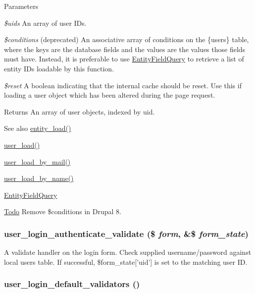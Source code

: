 \begin{DoxyParams}{Parameters}
\item[{\em \$uids}]An array of user IDs. \item[{\em \$conditions}](deprecated) An associative array of conditions on the \{users\} table, where the keys are the database fields and the values are the values those fields must have. Instead, it is preferable to use \hyperlink{classEntityFieldQuery}{EntityFieldQuery} to retrieve a list of entity IDs loadable by this function. \item[{\em \$reset}]A boolean indicating that the internal cache should be reset. Use this if loading a user object which has been altered during the page request.\end{DoxyParams}
\begin{DoxyReturn}{Returns}
An array of user objects, indexed by uid.
\end{DoxyReturn}
\begin{DoxySeeAlso}{See also}
\hyperlink{common_8inc_a78b89cf93f9710a68d02f86adccf1898}{entity\_\-load()} 

\hyperlink{user_8module_a0f7e67c4e909ca691f57889dd5a72a07}{user\_\-load()} 

\hyperlink{user_8module_a68a9c7c15776d0ad6d0f7eb85e294c2d}{user\_\-load\_\-by\_\-mail()} 

\hyperlink{user_8module_a2abc1fc7de4cd56af7658688c3614f86}{user\_\-load\_\-by\_\-name()} 

\hyperlink{classEntityFieldQuery}{EntityFieldQuery}
\end{DoxySeeAlso}
\begin{Desc}
\item[\hyperlink{todo__todo000023}{Todo}]Remove \$conditions in Drupal 8. \end{Desc}
\hypertarget{user_8module_a87098bdd1eef6b45820e23c53f8d8988}{
\subsubsection[{user\_\-login\_\-authenticate\_\-validate}]{\setlength{\rightskip}{0pt plus 5cm}user\_\-login\_\-authenticate\_\-validate (\$ {\em form}, \/  \&\$ {\em form\_\-state})}}
\label{user_8module_a87098bdd1eef6b45820e23c53f8d8988}
A validate handler on the login form. Check supplied username/password against local users table. If successful, \$form\_\-state\mbox{[}'uid'\mbox{]} is set to the matching user ID. \hypertarget{user_8module_ad839942de106a39384979b02221f64fb}{
\subsubsection[{user\_\-login\_\-default\_\-validators}]{\setlength{\rightskip}{0pt plus 5cm}user\_\-login\_\-default\_\-validators ()}}
